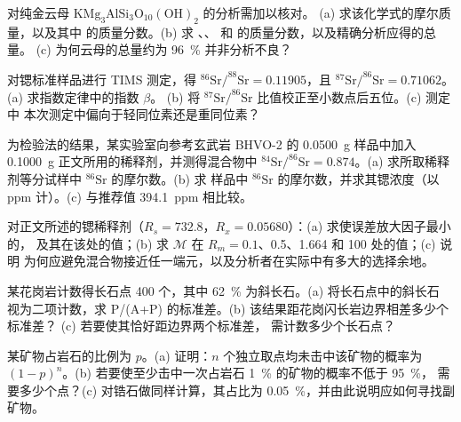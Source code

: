 \begin{exercise}[$\star\star$]\label{exo:b2:field-lab-methods-2:7}
对纯金云母 $\mathrm{KMg_3AlSi_3O_{10}(OH)_2}$ 的分析需加以核对。
(a) 求该化学式的摩尔质量，以及其中  的质量分数。(b) 求
、、 和  的质量分数，以及精确分析应得的总量。
(c) 为何云母的总量约为 \qty{96}{\percent} 并非分析不良？
\end{exercise}

\begin{exercise}[$\star\star$]\label{exo:b2:field-lab-methods-2:8}
对锶标准样品进行 TIMS 测定，得 $^{86}\mathrm{Sr}/^{88}\mathrm{Sr} = 0.11905$，且
$^{87}\mathrm{Sr}/^{86}\mathrm{Sr} = 0.71062$。(a) 求指数定律中的指数 $\beta$。
(b) 将 $^{87}\mathrm{Sr}/^{86}\mathrm{Sr}$ 比值校正至小数点后五位。(c) 测定中
本次测定中偏向于轻同位素还是重同位素？
\end{exercise}

\begin{exercise}[$\star\star$]\label{exo:b2:field-lab-methods-2:9}
为检验法的结果，某实验室向参考玄武岩 BHVO-2 的 \qty{0.0500}{g} 样品中加入
\qty{0.1000}{g} 正文所用的稀释剂，并测得混合物中 $^{84}\mathrm{Sr}/^{86}\mathrm{Sr} =
0.874$。(a) 求所取稀释剂等分试样中 $^{86}\mathrm{Sr}$ 的摩尔数。(b) 求
样品中 $^{86}\mathrm{Sr}$ 的摩尔数，并求其锶浓度（以 ppm 计）。(c) 与推荐值
\qty{394.1}{ppm} 相比较。
\end{exercise}

\begin{exercise}[$\star\star\star$]\label{exo:b2:field-lab-methods-2:10}
对正文所述的锶稀释剂（$R_s = 732.8$，$R_x = 0.05680$）：(a) 求使误差放大因子最小的，
及其在该处的值；(b) 求 $\mathcal M$ 在
$R_m = 0.1$、0.5、1.664 和 100 处的值；(c) 说明
为何应避免混合物接近任一端元，以及分析者在实际中有多大的选择余地。
\end{exercise}

\begin{exercise}[$\star\star\star$]\label{exo:b2:field-lab-methods-2:11}
某花岗岩计数得长石点 400 个，其中 \qty{62}{\percent} 为斜长石。(a) 将长石点中的斜长石
视为二项计数，求 P/(A+P) 的标准差。(b) 该结果距花岗闪长岩边界相差多少个标准差？
(c) 若要使其恰好距边界两个标准差，
需计数多少个长石点？
\end{exercise}

\begin{exercise}[$\star\star\star$]\label{exo:b2:field-lab-methods-2:12}
某矿物占岩石的比例为 $p$。(a) 证明：$n$ 个独立取点均未击中该矿物的概率为
$(1-p)^n$。(b) 若要使至少击中一次占岩石 \qty{1}{\percent} 的矿物的概率不低于 \qty{95}{\percent}，
需要多少个点？(c) 对锆石做同样计算，其占比为
\qty{0.05}{\percent}，并由此说明应如何寻找副矿物。
\end{exercise}

